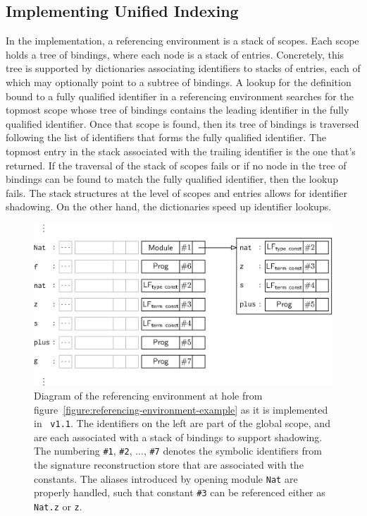 \subsection{Implementing Unified Indexing}

In the implementation, a referencing environment is a stack of scopes.
Each scope holds a tree of bindings, where each node is a stack of entries.
Concretely, this tree is supported by dictionaries associating identifiers to stacks of entries, each of which may optionally point to a subtree of bindings.
A lookup for the definition bound to a fully qualified identifier in a referencing environment searches for the topmost scope whose tree of bindings contains the leading identifier in the fully qualified identifier.
Once that scope is found, then its tree of bindings is traversed following the list of identifiers that forms the fully qualified identifier.
The topmost entry in the stack associated with the trailing identifier is the one that's returned.
If the traversal of the stack of scopes fails or if no node in the tree of bindings can be found to match the fully qualified identifier, then the lookup fails.
The stack structures at the level of scopes and entries allows for identifier shadowing.
On the other hand, the dictionaries speed up identifier lookups.

\begin{figure}[htb]
\includegraphics[width=\textwidth]{figures/referencing-environment-implementation.eps}
\caption[Example referencing environment in the implementation]{%
Diagram of the referencing environment at hole \texttt{} from figure~\ref{figure:referencing-environment-example} as it is implemented in \Beluga~\texttt{v1.1}.
The identifiers on the left are part of the global scope, and are each associated with a stack of bindings to support shadowing.
The numbering \texttt{\#1}, \texttt{\#2}, ..., \texttt{\#7} denotes the symbolic identifiers from the signature reconstruction store that are associated with the constants.
The aliases introduced by opening module \texttt{Nat} are properly handled, such that constant \texttt{\#3} can be referenced either as \texttt{Nat.z} or \texttt{z}.
}
\end{figure}

